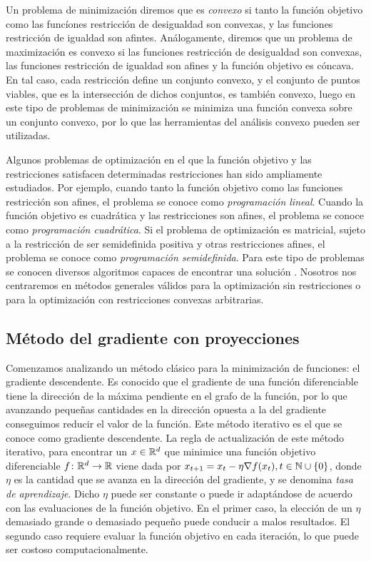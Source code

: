 \begin{definition}
    Un problema de minimización diremos que es \emph{convexo} si tanto la función objetivo como las funcíones restricción de desigualdad son convexas, y las funciones restricción de igualdad son afintes. Análogamente, diremos que un problema de maximización es convexo si las funciones restricción de desigualdad son convexas, las funciones restricción de igualdad son afines y la función objetivo es cóncava. En tal caso, cada restricción define un conjunto convexo, y el conjunto de puntos viables, que es la intersección de dichos conjuntos, es también convexo, luego en este tipo de problemas de minimización se minimiza una función convexa sobre un conjunto convexo, por lo que las herramientas del análisis convexo pueden ser utilizadas.
\end{definition}

Algunos problemas de optimización en el que la función objetivo y las restricciones satisfacen determinadas restricciones han sido ampliamente estudiados. Por ejemplo, cuando tanto la función objetivo como las funciones restricción son afines, el problema se conoce como \emph{programación lineal}. Cuando la función objetivo es cuadrática y las restricciones son afines, el problema se conoce como \emph{programación cuadrática}. Si el problema de optimización es matricial, sujeto a la restricción de ser semidefinida positiva y otras restricciones afines, el problema se conoce como \emph{programación semidefinida}. Para este tipo de problemas se conocen diversos algoritmos capaces de encontrar una solución \cite{convexoptimization}. Nosotros nos centraremos en métodos generales válidos para la optimización sin restricciones o para la optimización con restricciones convexas arbitrarias.

\subsection{Método del gradiente con proyecciones}

Comenzamos analizando un método clásico para la minimización de funciones: el gradiente descendente. Es conocido que el gradiente de una función diferenciable tiene la dirección de la máxima pendiente en el grafo de la función, por lo que avanzando pequeñas cantidades en la dirección opuesta a la del gradiente conseguimos reducir el valor de la función. Este método iterativo es el que se conoce como gradiente descendente. La regla de actualización de este método iterativo, para encontrar un $x \in \mathbb{R}^d$ que minimice una función objetivo diferenciable $f \colon \mathbb{R}^d \to \mathbb{R}$ viene dada por $x_{t+1} = x_t - \eta \nabla f(x_t), t \in \mathbb{N} \cup\{0\}$, donde $\eta$ es la cantidad que se avanza en la dirección del gradiente, y se denomina \emph{tasa de aprendizaje}. Dicho $\eta$ puede ser constante o puede ir adaptándose de acuerdo con las evaluaciones de la función objetivo. En el primer caso, la elección de un $\eta$ demasiado grande o demasiado pequeño puede conducir a malos resultados. El segundo caso requiere evaluar la función objetivo en cada iteración, lo que puede ser costoso computacionalmente.

